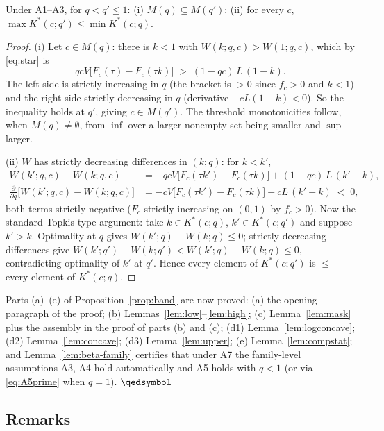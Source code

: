 \begin{lemma}\label{lem:compstat}
Under A1--A3, for $q < q' \le 1$: (i) $M(q) \subseteq M(q')$; (ii) for every $c$,
$\max K^*(c; q') \le \min K^*(c; q)$.
\end{lemma}

\begin{proof}
(i) Let $c \in M(q)$: there is $k < 1$ with $W(k; q, c) > W(1; q, c)$, which by
\eqref{eq:star} is
\[
qcV\bigl[F_c(\tau) - F_c(\tau k)\bigr] \;>\; (1 - qc)\,L\,(1 - k).
\]
The left side is strictly increasing in $q$ (the bracket is $> 0$ since $f_c > 0$ and
$k < 1$) and the right side strictly decreasing in $q$ (derivative $-cL(1 - k) < 0$).
So the inequality holds at $q'$, giving $c \in M(q')$. The threshold monotonicities
follow, when $M(q) \neq \emptyset$, from $\inf$ over a larger nonempty set being
smaller and $\sup$ larger.

(ii) $W$ has strictly decreasing differences in $(k; q)$: for $k < k'$,
\begin{align*}
W(k'; q, c) - W(k; q, c)
&= -qcV\bigl[F_c(\tau k') - F_c(\tau k)\bigr] + (1 - qc)\,L\,(k' - k),\\
\frac{\partial}{\partial q}\bigl[ W(k'; q, c) - W(k; q, c) \bigr]
&= -cV\bigl[F_c(\tau k') - F_c(\tau k)\bigr] - cL\,(k' - k) \;<\; 0,
\end{align*}
both terms strictly negative ($F_c$ strictly increasing on $(0,1)$ by $f_c > 0$). Now
the standard Topkis-type argument: take $k \in K^*(c; q)$, $k' \in K^*(c; q')$ and
suppose $k' > k$. Optimality at $q$ gives $W(k'; q) - W(k; q) \le 0$; strictly
decreasing differences give $W(k'; q') - W(k; q') < W(k'; q) - W(k; q) \le 0$,
contradicting optimality of $k'$ at $q'$. Hence every element of $K^*(c; q')$ is $\le$
every element of $K^*(c; q)$.
\end{proof}

\medskip
\noindent Parts (a)--(e) of Proposition~\ref{prop:band} are now proved: (a) the opening
paragraph of the proof; (b) Lemmas~\ref{lem:low}--\ref{lem:high}; (c)
Lemma~\ref{lem:mask} plus the assembly in the proof of parts (b) and (c); (d1)
Lemma~\ref{lem:logconcave}; (d2) Lemma~\ref{lem:concave}; (d3) Lemma~\ref{lem:upper};
(e) Lemma~\ref{lem:compstat}; and Lemma~\ref{lem:beta-family} certifies that under A7
the family-level assumptions A3, A4 hold automatically and A5 holds with $q < 1$ (or
via \eqref{eq:A5prime} when $q = 1$). \hfill$\qedsymbol$

\subsection*{Remarks}

